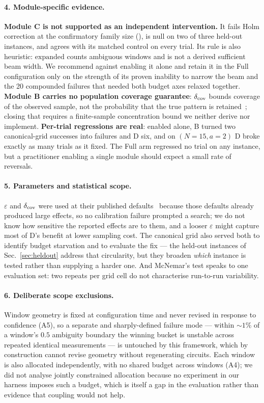 \paragraph{4. Module-specific evidence.}
\textbf{Module C is not supported as an independent intervention.} It
fails Holm correction at the confirmatory family size
(\SItables{}), is null on two of three held-out instances, and
agrees with its matched control on every trial. Its rule is also
heuristic: $\mathrm{expanded}$ counts ambiguous windows and is not a
derived sufficient beam width. We recommend against enabling it alone and
retain it in the Full configuration only on the strength of its proven
inability to narrow the beam and the 20 compounded failures that needed
both budget axes relaxed together. \textbf{Module B carries no population
coverage guarantee}: $\delta_{\mathrm{cov}}$ bounds coverage of the observed sample, not
the probability that the true pattern is retained~\cite{methodpaper}; closing that requires a finite-sample
concentration bound we neither derive nor implement. \textbf{Per-trial
regressions are real}: enabled alone, B turned two canonical-grid
successes into failures and D six, and on $(N{=}15,a{=}2)$ D broke
exactly as many trials as it fixed. The Full arm regressed no trial on
any instance, but a practitioner enabling a single module should expect a
small rate of reversals.

\paragraph{5. Parameters and statistical scope.}
$\varepsilon$ and $\delta_{\mathrm{cov}}$ were used at their published
defaults~\cite{methodpaper} because those defaults already produced large
effects, so no calibration failure prompted a search; we do not know how
sensitive the reported effects are to them, and a looser $\varepsilon$
might capture most of D's benefit at lower sampling cost. The canonical
grid also served both to identify budget starvation and to evaluate the
fix --- the held-out instances of Sec.~\ref{sec:heldout} address that
circularity, but they broaden \emph{which} instance is tested rather than
supplying a harder one. And McNemar's test speaks to one evaluation set:
two repeats per grid cell do not characterise run-to-run variability.

\paragraph{6. Deliberate scope exclusions.}
Window geometry is fixed at configuration time and never revised in
response to confidence (A5), so a separate and sharply-defined failure
mode --- within ${\sim}1\%$ of a window's $0.5$ ambiguity boundary the
winning bucket is unstable across repeated identical measurements --- is
untouched by this framework, which by construction cannot revise geometry
without regenerating circuits. Each window is also allocated
independently, with no shared budget across windows (A4); we did not
analyse jointly constrained allocation because no experiment in our
harness imposes such a budget, which is itself a gap in the evaluation
rather than evidence that coupling would not help.

